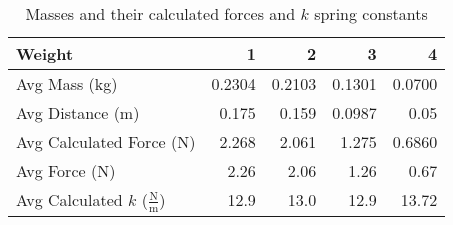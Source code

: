 \documentclass [12pt, letterpaper, twoside] {article}
\begin{document}
\begin {table}[H]
  \centering
  \begin {tabular}{| l | r | r | r | r |}
    \hline\hline
    Weight & 1 & 2 & 3 & 4 \\
    \hline
    Avg Mass (kg) & 0.2304 & 0.2103 & 0.1301 & 0.0700 \\
    \hline
    Avg Distance (m) & 0.175 & 0.159 & 0.0987 & 0.05 \\
    \hline
    Avg Calculated Force (N) & 2.268 & 2.061 & 1.275 & 0.6860 \\
    \hline
    Avg Force (N) & 2.26 & 2.06 & 1.26 & 0.67 \\
    \hline
    Avg Calculated \(k\) (\(\tfrac{\text{N}}{\text{m}}\)) & 12.9 & 13.0 & 12.9 & 13.72 \\
    \hline\hline
  \end {tabular} \\
  \caption {Masses and their calculated forces and \(k\) spring constants}
\end {table}
\end{document}
